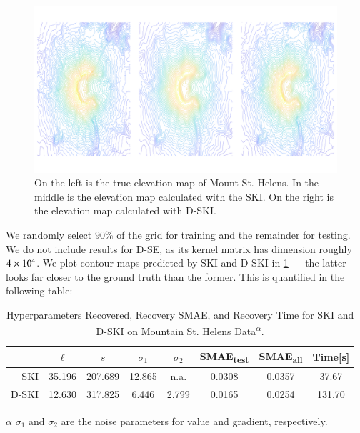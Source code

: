 \begin{figure}[ht]
  \begin{center}
    \includegraphics[width=\textwidth, height=0.47\textwidth, trim = 0cm 0cm 0cm
    0cm,clip]{./sgp/pics/mountainContour}
    \caption{On the left is the true elevation map of Mount St. Helens. In the
    middle is the elevation map calculated with the SKI. On the right is the
    elevation map calculated with D-SKI.}\label{fig:MtSH_map}
  \end{center}
\end{figure}

We randomly select $90\%$ of the grid for training and the remainder for
testing. We do not include results for D-SE, as its kernel matrix has dimension
roughly $4\mathbin{\times}10^4$. We plot contour maps predicted by SKI and D-SKI
in \cref{fig:MtSH_map} --- the latter looks far closer to the ground truth
than the former. This is quantified in the following table:

\begin{table}[ht]
  \centering
  \caption{Hyperparameters Recovered, Recovery SMAE, and Recovery Time for SKI
  and D-SKI on Mountain St. Helens Data\textsuperscript{$\alpha$}.}
  \label{tab:mtsthelens}
  \begin{threeparttable}
    \begin{tabular}{r c c c c c c c}
      \toprule
      & $\ell$ & $s$ & $\sigma_1$ & $\sigma_2$ & SMAE\textsubscript{test} &
      SMAE\textsubscript{all} & Time[s]\\ \midrule
      SKI & 35.196 & 207.689 & 12.865 & n.a. & 0.0308 & 0.0357 & 37.67\\
      D-SKI & 12.630 & 317.825 & 6.446 & 2.799 & 0.0165 & 0.0254 & 131.70\\
      \bottomrule
    \end{tabular}
    \begin{tablenotes}
      \item[$\alpha$] $\sigma_1$ and $\sigma_2$ are the noise parameters for
      value and gradient, respectively.
    \end{tablenotes}
  \end{threeparttable}
\end{table}

